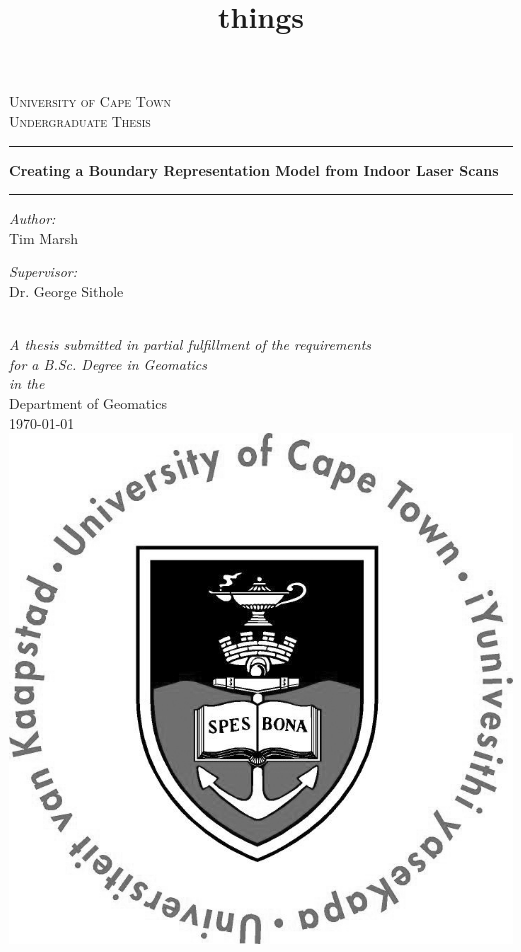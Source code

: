 

\begin{center}
	
	\textsc{\LARGE University of Cape Town}\\[1.5cm]
	\textsc{\Large Undergraduate Thesis}\\[0.5cm]
	
	\hrule
	\vspace{0.4cm}
	\title{things}
	{\huge \bfseries Creating a Boundary Representation Model from Indoor Laser Scans }\\[0.4cm]
	\hrule
	\vspace{1.5cm}
	
	\begin{minipage}{0.4\textwidth}
		\begin{flushleft} \large
			\emph{Author:}\\
			\textnormal{Tim Marsh}
		\end{flushleft}
	\end{minipage}
	\begin{minipage}{0.4\textwidth}
		\begin{flushright} \large
			\emph{Supervisor:} \\
			\textnormal{Dr. George Sithole}
		\end{flushright}
	\end{minipage}\\[1cm]
	
	\large \textit{A thesis submitted in partial fulfillment of the requirements\\ for a B.Sc. Degree in Geomatics}\\[0.3cm]
	\textit{in the}\\[0.4cm]
	Department of Geomatics\\[1.5cm]
	
	{\large \today}\\[0.5cm]
	\includegraphics[scale=0.75]{Includes/images/UCTcircular_logo1_CMYK}
	
	\vfill
\end{center}
